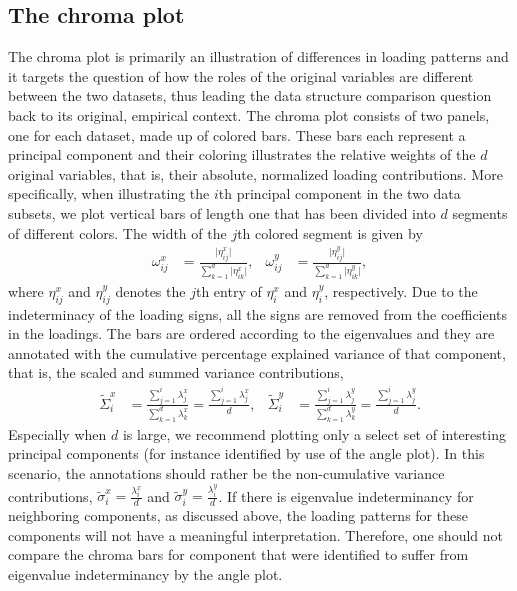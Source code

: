 \documentclass[]{interact}
\theoremstyle{plain}%
\theoremstyle{definition}
\theoremstyle{remark}
\begin{document}
\subsection{The chroma plot}
The chroma plot is primarily an illustration of differences in loading patterns and it targets the question of how the roles of the original variables are different between the two datasets, thus leading the data structure comparison question back to its original, empirical context. The chroma plot consists of two panels, one for each dataset, made up of colored bars. These bars each represent a principal component and their coloring illustrates the relative weights of the $d$ original variables, that is, their absolute, normalized loading contributions. More specifically, when illustrating the $i$th principal component in the two data subsets, we plot vertical bars of length one that has been divided into $d$ segments of different colors. The width of the $j$th colored segment is given by
\begin{align*}
\omega_{ij}^x &= \frac{\lvert\eta_{ij}^x \rvert}{\sum_{k=1}^d \lvert\eta_{ik}^x\rvert}, &
\omega_{ij}^y &= \frac{\lvert\eta_{ij}^y\rvert}{\sum_{k=1}^d \lvert\eta_{ik}^y\rvert},
\end{align*}
where $\eta_{ij}^x$ and $\eta_{ij}^y$ denotes the $j$th entry of $\eta_{i}^x$ and $\eta_{i}^y$, respectively. Due to the indeterminacy of the loading signs, all the signs are removed from the coefficients in the loadings. The bars are ordered according to the eigenvalues and they are annotated with the cumulative percentage explained variance of that component, that is, the scaled and summed variance contributions,
\begin{align*}
\tilde\Sigma^x_{i} &= \frac{\sum_{j=1}^i \lambda_{j}^x}{\sum_{k=1}^d \lambda_{k}^x} = \frac{\sum_{j=1}^i \lambda_{j}^x}{d}, &
\tilde\Sigma^y_{i} &= \frac{\sum_{j=1}^i \lambda_{j}^y}{\sum_{k=1}^d \lambda_{k}^y} = \frac{\sum_{j=1}^i \lambda_{j}^y}{d}.
\end{align*}
Especially when $d$ is large, we recommend plotting only a select set of interesting principal components (for instance identified by use of the angle plot). In this scenario, the annotations should rather be the non-cumulative variance contributions, $\tilde\sigma_{i}^x = \frac{\lambda_{i}^x}{d}$ and $\tilde\sigma_{i}^y = \frac{\lambda_{i}^y}{d}$. 
If there is eigenvalue indeterminancy for neighboring components, as discussed above, the loading patterns for these components will not have a meaningful interpretation. Therefore, one should not compare the chroma bars for component that were identified to suffer from eigenvalue indeterminancy by the angle plot. 
\end{document}
